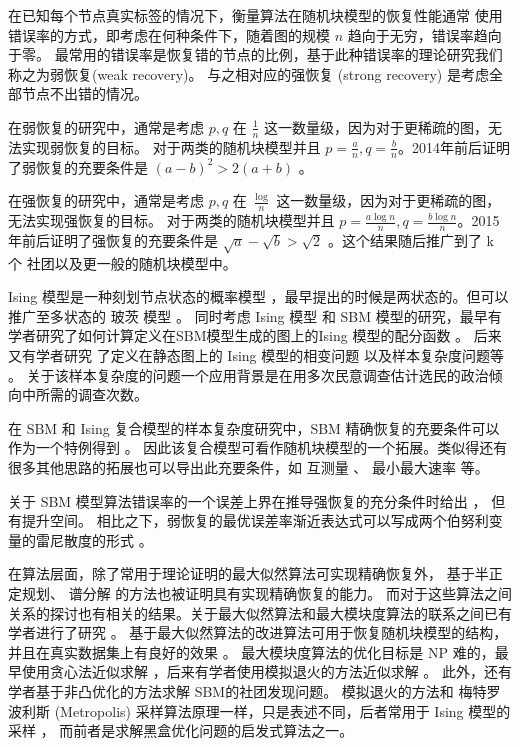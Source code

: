 在已知每个节点真实标签的情况下，衡量算法在随机块模型的恢复性能通常
使用错误率的方式，即考虑在何种条件下，随着图的规模 $n$ 趋向于无穷，错误率趋向于零。
最常用的错误率是恢复错的节点的比例，基于此种错误率的理论研究我们称之为弱恢复(weak recovery)。
与之相对应的强恢复 (strong recovery) 是考虑全部节点不出错的情况。

在弱恢复的研究中，通常是考虑 $p, q$ 在 $\frac{1}{n}$ 这一数量级，因为对于更稀疏的图，无法实现弱恢复的目标。
对于两类的随机块模型并且 $p=\frac{a}{n}, q = \frac{b}{n}$。2014年前后证明了弱恢复的充要条件是 $(a-b)^2 > 2(a+b)$
\cite{mossel2015reconstruction, mossel2018proof}。

在强恢复的研究中，通常是考虑 $p, q$ 在 $\frac{\log}{n}$ 这一数量级，因为对于更稀疏的图，无法实现强恢复的目标。
对于两类的随机块模型并且 $p=\frac{a \log n}{n}, q = \frac{b \log n }{n}$。2015年前后证明了强恢复的充要条件是
$\sqrt{a} - \sqrt{b} > \sqrt{2}$ \cite{abbe2015exact, mossel2016}。这个结果随后推广到了 k 个
社团以及更一般的随机块模型中\cite{abbe2015community}。

Ising 模型是一种刻划节点状态的概率模型 \cite{ising1925beitrag}，最早提出的时候是两状态的。但可以推广至多状态的 玻茨 模型 \cite{potts1952some}。
同时考虑 Ising 模型 和 SBM 模型的研究，最早有学者研究了如何计算定义在SBM模型生成的图上的Ising 模型的配分函数 \cite{liu2017log}。
后来又有学者研究 了定义在静态图上的 Ising 模型的相变问题 \cite{berthet2019exact} 以及样本复杂度问题等 \cite{ye2020exact}。
关于该样本复杂度的问题一个应用背景是在用多次民意调查估计选民的政治倾向中所需的调查次数。

在 SBM 和 Ising 复合模型的样本复杂度研究中，SBM 精确恢复的充要条件可以作为一个特例得到 \cite{ye2020exact}。
因此该复合模型可看作随机块模型的一个拓展。类似得还有很多其他思路的拓展也可以导出此充要条件，如 互测量 \cite{chen2016information}、 最小最大速率 \cite{zhang2016} 等。

关于 SBM 模型算法错误率的一个误差上界在推导强恢复的充分条件时给出 \cite{abbe2015exact}，
但有提升空间。
相比之下，弱恢复的最优误差率渐近表达式可以写成两个伯努利变量的雷尼散度的形式 \cite{zhang2016}。

在算法层面，除了常用于理论证明的最大似然算法可实现精确恢复外，
基于半正定规划\cite{hajek2016achieving}、
谱分解\cite{Yun2014} 的方法也被证明具有实现精确恢复的能力。
而对于这些算法之间关系的探讨也有相关的结果。关于最大似然算法和最大模块度算法的联系之间已有学者进行了研究 \cite{newman2016equivalence}。
基于最大似然算法的改进算法可用于恢复随机块模型的结构，并且在真实数据集上有良好的效果
\cite{karrer2011stochastic}。
最大模块度算法的优化目标是 NP 难的，最早使用贪心法近似求解 \cite{clauset2004finding}，后来有学者使用模拟退火的方法近似求解 \cite{he2016fast}。
此外，还有学者基于非凸优化的方法求解 SBM的社团发现问题\cite{wang2021non}。
模拟退火的方法和 梅特罗波利斯 (Metropolis) 采样算法原理一样，只是表述不同，后者常用于 Ising 模型的采样 \cite{metropolis1953equation}，
而前者是求解黑盒优化问题的启发式算法之一。



